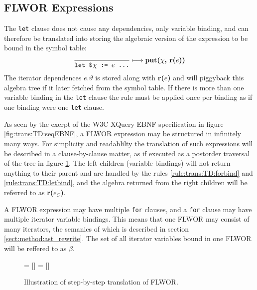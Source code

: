 \subsection{FLWOR Expressions}
\label{sect:trans:TD:simpleFLWOR}
The \texttt{let} clause does not cause any dependencies, only variable binding, and can therefore be translated
into storing the algebraic version of the expression to be bound in the symbol table:
\begin{equation}
\frac{}{\mbox{\texttt{let \$}}\chi \mbox{\texttt{ := }}e \mbox{\texttt{ \ldots}}}\longmapsto
\mbox{\textbf{put(}}\chi\mbox{\textbf{, r(}}e\mbox{\textbf{))}}
\label{rule:trans:TD:letbind}
\end{equation}
The iterator dependences $e.\vartheta$ is stored along with \textbf{r(}$e$\textbf{)} and will piggyback this
algebra tree if it later fetched from the symbol table. If there is more than one variable binding in the
\texttt{let} clause the rule must be applied once per binding as if one binding were one \texttt{let} clause.

As seen by the exerpt of the W3C XQuery EBNF specification in figure \ref{fig:trans:TD:seqEBNF}, a FLWOR
expression may be structured in infinitely many ways. For simplicity and readablilty the translation of such
expressions will be described in a clause-by-clause matter, as if executed as a postorder traversal of the tree in
figure \ref{fig:trans:TD:flworExecute}. The left children (variable bindings) will not return anything to their
parent and are handled by the rules \ref{rule:trans:TD:forbind} and \ref{rule:trans:TD:letbind}, and the algebra
returned from the right children will be referred to as \textbf{r(}$e_{C}$\textbf{)}. 

A FLWOR expression may have multiple \texttt{for} clauses, and a \texttt{for} clause may have multiple iterator
variable bindings. This means that one FLWOR may consist of many iterators, the semanics of which is described in
section \ref{sect:method:ast_rewrite}. The set of all iterator variables bound in one FLWOR will be reffered to as
$\beta$.

\begin{figure}[h]
\centering
{}= []%
= [] %

\label{fig:trans:TD:flworExecute}
\caption[FLWOR translation order]{Illustration of step-by-step translation of FLWOR.}
\end{figure}

